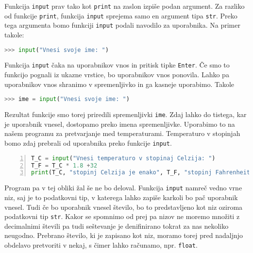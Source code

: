 Funkcija \texttt{input} prav tako kot \texttt{print} na zaslon izpiše podan argument. Za razliko od funkcije \texttt{print}, funkcija \texttt{input} sprejema samo en argument tipa \texttt{str}. Preko tega argumenta bomo funkciji \texttt{input} podali navodilo za uporabnika. Na primer takole:
\begin{lstlisting}[language=Python, showstringspaces=false]
>>> input("Vnesi svoje ime: ")
\end{lstlisting}
Funkcija \texttt{input} čaka na uporabnikov vnos in pritisk tipke \texttt{Enter}. Če smo to funkcijo pognali iz ukazne vrstice, bo uporabnikov vnos ponovila. Lahko pa uporabnikov vnos shranimo v spremenljivko in ga kasneje uporabimo. Takole
\begin{lstlisting}[language=Python, showstringspaces=false]
>>> ime = input("Vnesi svoje ime: ")
\end{lstlisting}
Rezultat funkcije \texttt{} smo torej priredili spremenljivki \texttt{ime}. Zdaj lahko do tistega, kar je uporabnik vnesel, dostopamo preko imena spremenljivke. Uporabimo to na našem programu za pretvarjanje med temperaturami. Temperaturo v stopinjah bomo zdaj prebrali od uporabnika preko funkcije \texttt{input}.
\begin{lstlisting}[language=Python, showstringspaces=false,numbers=left]
T_C = input("Vnesi temperaturo v stopinaj Celzija: ")
T_F = T_C * 1.8 +32
print(T_C, "stopinj Celzija je enako", T_F, "stopinj Fahrenheit.")
\end{lstlisting}
Program pa v tej obliki žal še ne bo deloval. Funkcija \texttt{input} namreč vedno vrne niz, saj je to podatkovni tip, v katerega lahko zapiše karkoli bo pač uporabnik vnesel. Tudi če bo uporabnik vnesel število, bo to predstavljeno kot niz oziroma podatkovni tip \texttt{str}. Kakor se spomnimo od prej pa nizov ne moremo množiti z decimalnimi števili pa tudi seštevanje je denifinirano tokrat za nas nekoliko neugodno. Prebrano število, ki je zapisano kot niz, moramo torej pred nadaljnjo obdelavo pretvoriti v nekaj, s čimer lahko računamo, npr. \texttt{float}. 


